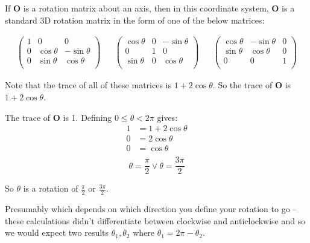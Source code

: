 \documentclass[10pt,oneside,a4paper]{article}
\begin{document}
\begin{enumerate}
If $\mathbf{O}$ is a rotation matrix about an axis, then in this coordinate system,
$\mathbf{O}$ is a standard 3D rotation matrix in the form of one of the below matrices:

\begin{align}
\begin{pmatrix}
1 & 0 & 0 \\
0 & \cos\theta & -\sin\theta \\
0 & \sin\theta & \cos\theta \\
\end{pmatrix}
& &
\begin{pmatrix}
\cos\theta & 0 & -\sin\theta \\
0 & 1 & 0 \\
\sin\theta & 0 & \cos\theta \\
\end{pmatrix}
& &
\begin{pmatrix}
\cos\theta & -\sin\theta & 0\\
\sin\theta & \cos\theta  & 0\\
0 & 0 & 1 \\
\end{pmatrix}
\end{align}

Note that the trace of all of these matrices is $1 + 2\cos\theta$. So the
trace of $\mathbf{O}$ is $1 + 2\cos\theta$.

The trace of $\mathbf{O}$ is 1. Defining $0 \leq \theta < 2\pi$ gives:
\[
\begin{split}
1 &= 1 + 2\cos\theta \\
0 &= 2\cos\theta \\
0 &= \cos\theta \\
\end{split}
\]
\[
\theta = \frac{\pi}{2} \vee \theta = \frac{3\pi}{2}
\]

So $\theta$ is a rotation of $\frac{\pi}{2}$ or $\frac{3\pi}{2} $.

\dag Presumably which depends on which direction you define your rotation to
go -- these calculations didn't differentiate between clockwise and anticlockwise
and so we would expect two results $\theta_1, \theta_2$ where $\theta_1 = 2\pi - \theta_2$.

\end{enumerate}
\end{document}
